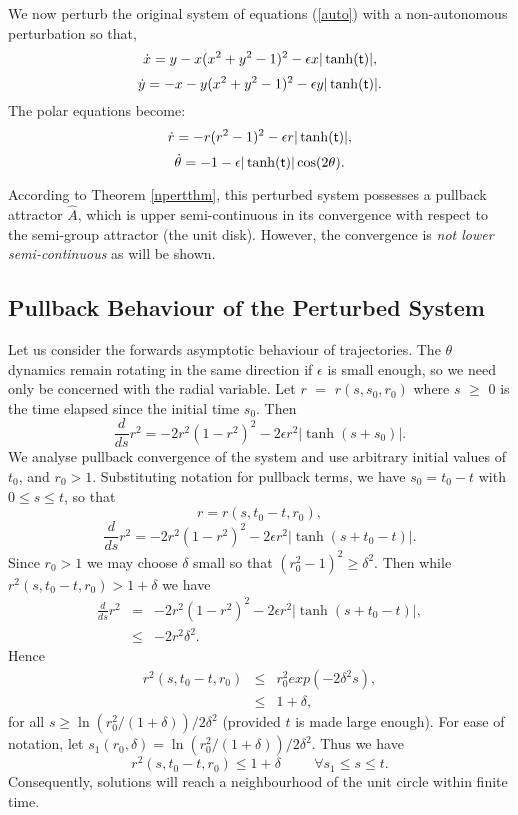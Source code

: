We now perturb the original system of equations (\ref{auto}) with a
non-autonomous perturbation so that,
\begin{equation}
  \dot{x} = y - x(x^{2} + y^{2} - 1)^{2} - \epsilon x  |\tanh ( \mathsf{\mathsf{t}})|,
  \label{pert}
\end{equation}
\[ \dot{y} = -x - y(x^{2} + y^{2} - 1)^{2} - \epsilon y  |\tanh ( \mathsf{\mathsf{t}})|. \]
The polar equations become:
\begin{equation}
  \dot{r} = - r (r^{2} - 1)^2 - \epsilon r |\tanh ( \mathsf{\mathsf{t}})|,
  \label{autopolar2}
\end{equation}
\[ \dot{\theta} = -1 - \epsilon |\tanh ( \mathsf{\mathsf{t}})| \cos(2\theta). \]

According to Theorem \ref{npertthm}, this perturbed system possesses a
pullback attractor $\hat{A}$, which is upper semi-continuous in its
convergence with respect to the semi-group attractor (the unit disk).
However, the convergence is {\em not lower semi-continuous} as will be
shown.

\subsection{Pullback Behaviour of the Perturbed System}

Let us consider the forwards asymptotic behaviour of trajectories. The
$\theta$ dynamics remain rotating in the same direction if $\epsilon$ is
small enough, so we need only be concerned with the radial variable.
Let $r$ $=$ $r(s,s_0,r_0)$ where  $s$ $\geq$ $0$ is the time elapsed since
the initial time $s_0$. Then
\[ \frac{d}{ds} r^2 = - 2r^2(1-r^2)^2 - 2 \epsilon r^2 |\tanh (s+s_{0})|. \]
We analyse pullback convergence of the system and use arbitrary initial
values of $t_{0}$, and $r_{0} > 1$. Substituting notation for pullback
terms, we have $s_{0} = t_{0} - t$ with $0 \leq s \leq t$, so that
\[  r = r(s,t_{0}-t,r_{0}), \]
\begin{equation}\label{derivexeq}
  \frac{d}{ds} r^2 = - 2r^2(1-r^2)^2 - 2 \epsilon r^2 |\tanh (s+t_{0}-t)|.
\end{equation}
Since $r_{0} > 1$ we may choose $\delta$ small so that
$(r_{0}^{2}-1)^{2} \geq \delta^{2}$.
Then while $r^2(s,t_{0}-t,r_{0}) > 1
+ \delta$ we have
\begin{eqnarray*}
  \frac{d}{ds} r^2  & = & - 2r^2(1-r^2)^2 - 2 \epsilon r^2
        |\tanh (s+t_0-t)|, \\
  & \leq & - 2 r^2 \delta^{2}.
\end{eqnarray*}
Hence
\begin{eqnarray*}
r^2(s,t_0-t,r_0)  & \leq & r_0^2 exp(- 2 \delta^{2}s), \\[2ex]
& \leq & 1 + \delta,
\end{eqnarray*}
for all $s \geq \ln \left( r_{0}^2/(1+\delta) \right) / 2 \delta^{2}$
(provided $t$ is made large enough). For ease of notation, let
$s_{1}(r_{0},\delta) = \ln \left( r_{0}^2/(1+\delta) \right) / 2
\delta^{2}$. Thus we have
\begin{equation*}
  r^2(s,t_0-t,r_{0}) \leq 1 + \delta \hspace{1cm} \forall s_{1} \leq s
        \leq t.
\end{equation*}
Consequently, solutions will reach a neighbourhood of the unit circle within
finite time.


